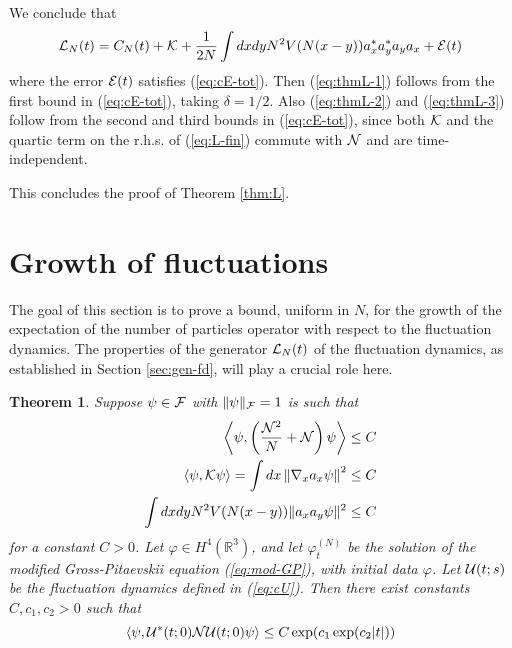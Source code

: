 \documentclass[11pt,a4paper,DIV11]{scrartcl}	%
\newtheorem{theorem}{Theorem}[section]
\newcommand{\cU}{{\cal U}}
\newcommand{\bR}{{\mathbb R}}
\newcommand{\cF}{{\cal F}}
\newcommand{\cE}{{\cal E}}
\newcommand{\cK}{{\cal K}}
\newcommand{\cL}{{\cal L}}
\newcommand{\cN}{{\cal N}}
\begin{document}
We conclude that
\begin{equation}\label{eq:L-fin} \cL_N (t) = C_N (t) + \cK  + \frac{1}{2N}  \int dx dy N^2 V (N (x-y)) a_x^* a_y^* a_y a_x + \cE (t) \end{equation}
where the error $\cE (t)$ satisfies (\ref{eq:cE-tot}). Then (\ref{eq:thmL-1}) follows from the first bound in (\ref{eq:cE-tot}), taking $\delta = 1/2$. Also (\ref{eq:thmL-2}) and (\ref{eq:thmL-3}) follow from the second and third bounds in (\ref{eq:cE-tot}), since both $\cK$ and the quartic term on the r.h.s. of (\ref{eq:L-fin}) commute with $\cN$ and are time-independent. 

This concludes the proof of Theorem \ref{thm:L}.

\section{Growth of fluctuations}

The goal of this section is to prove a bound, uniform in $N$, for the growth of the expectation of the number of particles operator with respect to the fluctuation dynamics. The properties of the generator $\cL_N (t)$ of the fluctuation dynamics, as established in Section \ref{sec:gen-fd}, will play a crucial role here.

\begin{theorem}\label{thm:N}
Suppose $\psi \in \cF$ with $\| \psi \|_\cF  =1$ is such that \begin{equation}\label{eq:ass-grw} \begin{split} \left\langle \psi , \left( \frac{\cN^2}{N} + \cN \right) \psi \right\rangle &\leq C \\ \left\langle \psi , \cK \psi \right\rangle = \int dx \left\| \nabla_x a_x \psi \right\|^2 & \leq C \\
\int dx dy N^2 V(N (x-y)) \| a_x a_y \psi \|^2 &\leq C 
 \end{split} \end{equation}
for a constant $C>0$. Let $\varphi \in H^4 (\bR^3)$, and let $\varphi_t^{(N)}$ be the solution of the modified Gross-Pitaevskii equation (\ref{eq:mod-GP}), with initial data $\varphi$. Let $\cU (t;s)$ be the fluctuation dynamics defined in (\ref{eq:cU}). Then there exist constants $C,c_1,c_2 > 0$ such that
\[ \langle \psi , \cU^* (t;0) \cN \cU (t;0) \psi \rangle \leq C \exp (c_1 \exp (c_2 |t|)) \] 
\end{theorem}
\end{document}
